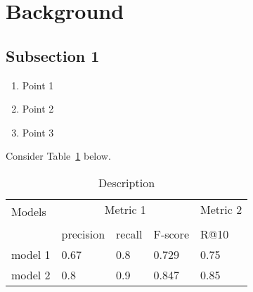 \section{Background} 
\subsection{Subsection 1}
\lipsum[10]
\begin{enumerate}
    \item Point 1
    \item Point 2
    \item Point 3
\end{enumerate}
\lipsum[1]

Consider Table~\ref{tab:example} below.
\begin{table}
    \centering
    \caption{Description}
    \label{tab:example}
    \begin{tabular}{@{}lllll@{}}
        \toprule
        \multirow{2}{*}[-1em]{Models} & \multicolumn{3}{c}{Metric 1} & Metric 2\\
        \addlinespace[10pt]
        \cmidrule(lr){2-4} \cmidrule(lr){5-5} \\
        {} & precision & recall & F-score  & R@10 \\
        \midrule
        model 1 & 0.67  & 0.8 & 0.729  & 0.75 \\
        model 2 & 0.8 & 0.9 & 0.847 & 0.85 \\
        \bottomrule
    \end{tabular}
\end{table}
